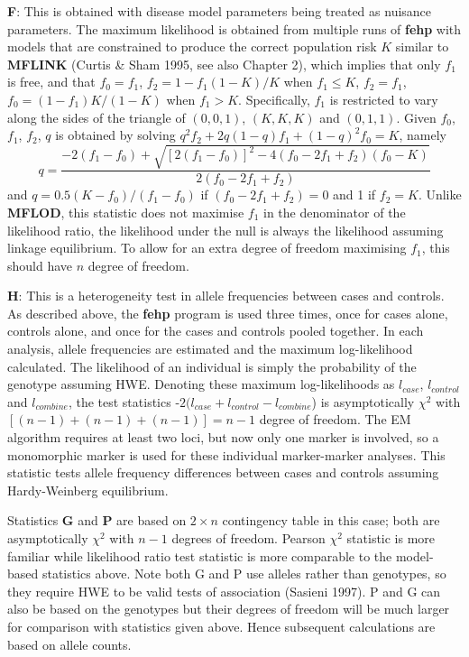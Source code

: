 {\bf F}:  This is obtained with disease model parameters being treated as
nuisance parameters.  The maximum likelihood is obtained from multiple runs of
{\bf fehp} with models that are constrained to produce the correct population
risk $K$ similar to {\bf MFLINK} (Curtis \& Sham 1995, see also Chapter 2),
which implies that only $f_1$ is free, and that $f_0 = f_1$, $f_2 =
1-f_1(1-K)/K$ when $f_1\leq K$, $f_2 = f_1$, $f_0 = (1-f_1)K/(1-K)$ when
$f_1>K$.  Specifically, $f_1$ is restricted to vary along the sides of the
triangle of $(0,0,1)$, $(K,K,K)$ and $(0, 1, 1)$.  Given $f_0$, $f_1$,
$f_2$, $q$ is obtained by solving $q^2f_2+2q(1-q)f_1+(1-q)^2f_0 = K$, namely
$$q=\frac{-2(f_1-f_0) + \sqrt{[2(f_1-f_0)]^2 - 4(f_0-2f_1+f_2)(f_0-K)}}
{2(f_0-2f_1+f_2)}$$ and $q=0.5(K-f_0)/(f_1-f_0)$ if $(f_0-2f_1+f_2)=0$ and 1 if
$f_2=K$.  Unlike {\bf MFLOD}, this statistic does not maximise $f_1$ in the
denominator of the likelihood ratio, the likelihood under the null is always
the likelihood assuming linkage equilibrium. To allow for an extra degree
of freedom maximising $f_1$, this should have $n$ degree of freedom.

{\bf H}:  This is a heterogeneity test in allele frequencies between cases and
controls.  As described above, the {\bf fehp} program is used three times, once
for cases alone, controls alone, and once for the cases and controls pooled
together.  In each analysis, allele frequencies are estimated and the maximum
log-likelihood calculated.  The likelihood of an individual is simply the
probability of the genotype assuming HWE.  Denoting these maximum
log-likelihoods as $l_{case}$, $l_{control}$ and $l_{combine}$, the test
statistics -$2(l_{case}+l_{control}-l_{combine}$) is asymptotically $\chi^2$
with $[(n-1) + (n-1) + (n-1)]=n-1$ degree of freedom.  The EM algorithm
requires at least two loci, but now only one marker is involved, so a
monomorphic marker is used for these individual marker-marker analyses.  This
statistic tests allele frequency differences between cases and controls
assuming Hardy-Weinberg equilibrium.

Statistics {\bf G} and {\bf P} are based on $2\times n$ contingency table in
this case; both are asymptotically $\chi^2$ with $n-1$ degrees of freedom.
Pearson $\chi^2$ statistic is more familiar while likelihood ratio test
statistic is more comparable to the model-based statistics above.  Note both G
and P use alleles rather than genotypes, so they require HWE to be valid tests
of association (Sasieni 1997).  P and G can also be based on the genotypes but
their degrees of freedom will be much larger for comparison with statistics
given above.  Hence subsequent calculations are based on allele counts.

